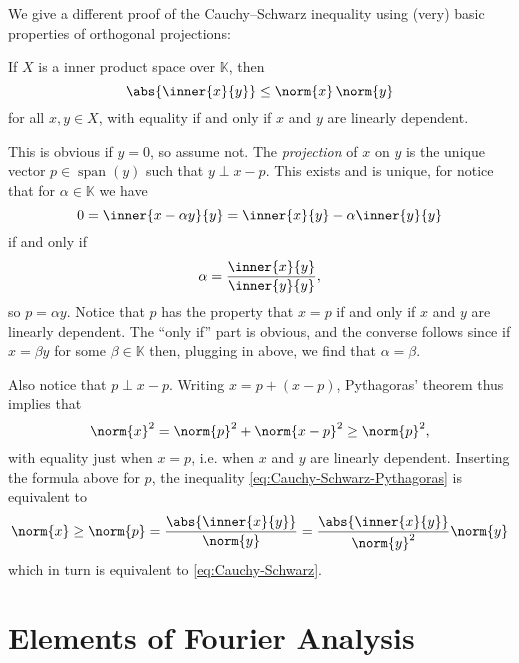 \documentclass[article, a4paper, 11pt, oneside]{memoir}
\numberwithin{equation}{chapter}
\newcommand{\bbK}{\mathbb{K}}
\DeclareMathOperator{\Span}{span}
\newenvironment{displaytheorem}{%
	\begin{displayquote}\itshape%
}{%
	\end{displayquote}%
}
\theoremstyle{nonumberplain}
\begin{document}
\begin{remark}
	We give a different proof of the Cauchy--Schwarz inequality using (very) basic properties of orthogonal projections:
	\begin{displaytheorem}
		If $X$ is a inner product space over $\bbK$, then
		\begin{equation}
			\label{eq:Cauchy-Schwarz}
			\abs{ \inner{x}{y} }
				\leq \norm{x} \, \norm{y}
		\end{equation}
		for all $x,y \in X$, with equality if and only if $x$ and $y$ are linearly dependent.
	\end{displaytheorem}
	This is obvious if $y = 0$, so assume not. The \emph{projection} of $x$ on $y$ is the unique vector $p \in \Span(y)$ such that $y \perp x - p$. This exists and is unique, for notice that for $\alpha \in \bbK$ we have
	\begin{equation*}
		0
			= \inner{x - \alpha y}{y}
			= \inner{x}{y} - \alpha \inner{y}{y}
	\end{equation*}
	if and only if
	\begin{equation*}
		\alpha
			= \frac{ \inner{x}{y} }{ \inner{y}{y} },
	\end{equation*}
	so $p = \alpha y$. Notice that $p$ has the property that $x = p$ if and only if $x$ and $y$ are linearly dependent. The \enquote{only if} part is obvious, and the converse follows since if $x = \beta y$ for some $\beta \in \bbK$ then, plugging in above, we find that $\alpha = \beta$.

	Also notice that $p \perp x - p$. Writing $x = p + (x - p)$, Pythagoras' theorem thus implies that
	\begin{equation}
		\label{eq:Cauchy-Schwarz-Pythagoras}
		\norm{x}^2
			= \norm{p}^2 + \norm{x - p}^2
			\geq \norm{p}^2,
	\end{equation}
	with equality just when $x = p$, i.e. when $x$ and $y$ are linearly dependent. Inserting the formula above for $p$, the inequality \cref{eq:Cauchy-Schwarz-Pythagoras} is equivalent to
	\begin{equation*}
		\norm{x}
			\geq \norm{p}
			= \frac{ \abs{\inner{x}{y}} }{ \norm{y} }
			= \frac{ \abs{\inner{x}{y}} }{ \norm{y}^2 } \norm{y}
	\end{equation*}
	which in turn is equivalent to \cref{eq:Cauchy-Schwarz}.
\end{remark}


\addtocounter{chapter}{2}
\chapter{Elements of Fourier Analysis}
\end{document}
